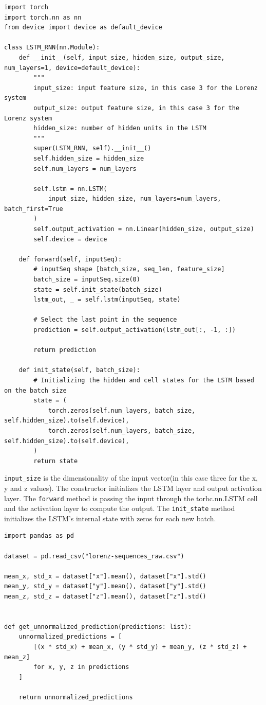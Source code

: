 \documentclass[11pt]{article}
\begin{document}
\begin{lstlisting}[label=lstm, caption={LSTM RNN implementation}]
import torch
import torch.nn as nn
from device import device as default_device

class LSTM_RNN(nn.Module):
    def __init__(self, input_size, hidden_size, output_size, num_layers=1, device=default_device):
        """
        input_size: input feature size, in this case 3 for the Lorenz system
        output_size: output feature size, in this case 3 for the Lorenz system
        hidden_size: number of hidden units in the LSTM
        """
        super(LSTM_RNN, self).__init__()
        self.hidden_size = hidden_size
        self.num_layers = num_layers

        self.lstm = nn.LSTM(
            input_size, hidden_size, num_layers=num_layers, batch_first=True
        )
        self.output_activation = nn.Linear(hidden_size, output_size)
        self.device = device

    def forward(self, inputSeq):
        # inputSeq shape [batch_size, seq_len, feature_size]
        batch_size = inputSeq.size(0)
        state = self.init_state(batch_size)
        lstm_out, _ = self.lstm(inputSeq, state)

        # Select the last point in the sequence
        prediction = self.output_activation(lstm_out[:, -1, :])

        return prediction

    def init_state(self, batch_size):
        # Initializing the hidden and cell states for the LSTM based on the batch size
        state = (
            torch.zeros(self.num_layers, batch_size, self.hidden_size).to(self.device),
            torch.zeros(self.num_layers, batch_size, self.hidden_size).to(self.device),
        )
        return state
\end{lstlisting}

\texttt{input\_size} is the dimensionality of the input vector(in this case three for the x, y and z values). The constructor initializes the LSTM layer and output activation layer. The \texttt{forward} method is passing the input through the torhc.nn.LSTM cell and the activation layer to compute the output. The \texttt{init\_state} method initializes the LSTM's internal state with zeros for each new batch. \\

\begin{lstlisting}[caption={inverse normalization}, label=inverse:normalization]
import pandas as pd

dataset = pd.read_csv("lorenz-sequences_raw.csv")

mean_x, std_x = dataset["x"].mean(), dataset["x"].std()
mean_y, std_y = dataset["y"].mean(), dataset["y"].std()
mean_z, std_z = dataset["z"].mean(), dataset["z"].std()


def get_unnormalized_prediction(predictions: list):
    unnormalized_predictions = [
        [(x * std_x) + mean_x, (y * std_y) + mean_y, (z * std_z) + mean_z]
        for x, y, z in predictions
    ]

    return unnormalized_predictions
\end{lstlisting}
\end{document}
